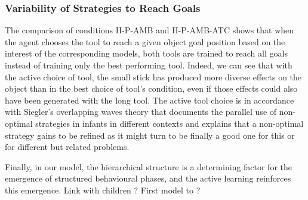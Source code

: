 \documentclass[10pt,letterpaper]{article}
\begin{document}
	
	\subsubsection{Variability of Strategies to Reach Goals}
	
		The comparison of conditions H-P-AMB and H-P-AMB-ATC shows that when the agent chooses the tool to reach a given object goal position based on the interest of the corresponding models,
		both tools are trained to reach all goals instead of training only the best performing tool.
		Indeed, we can see that with the active choice of tool, the small stick has produced more diverse effects on the object than in the best choice of tool's condition, even if those effects could also have been 
		generated with the long tool.
		The active tool choice is in accordance with Siegler's overlapping waves theory that documents the parallel use of non-optimal strategies in infants in different contexts
		and explains that a non-optimal strategy gains to be refined as it might turn to be finally a good one for this or for different but related problems.
		
	
	Finally, in our model, the hierarchical structure is a determining factor for the emergence of structured behavioural phases, and the active learning reinforces this emergence.
	Link with children ?
	First model to ?
	
%






\setlength{\bibleftmargin}{.125in}
\setlength{\bibindent}{-\bibleftmargin}


\end{document}
